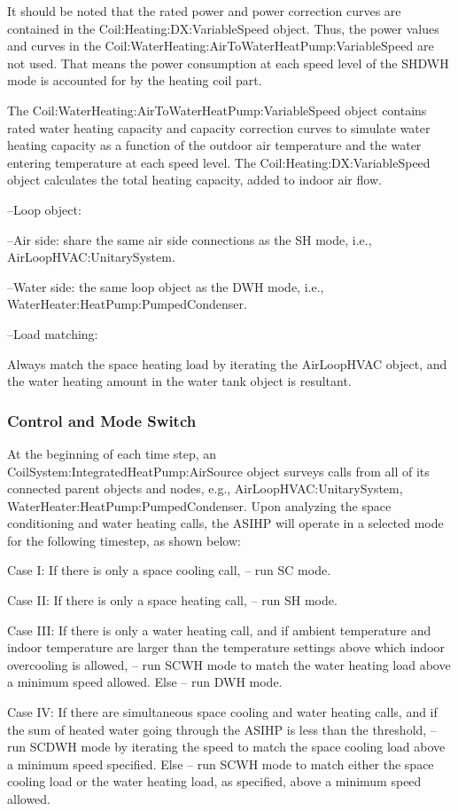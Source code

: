 It should be noted that the rated power and power correction curves are contained in the Coil:Heating:DX:VariableSpeed object. Thus, the power values and curves in the Coil:WaterHeating:AirToWaterHeatPump:VariableSpeed are not used. That means the power consumption at each speed level of the SHDWH mode is accounted for by the heating coil part.

The Coil:WaterHeating:AirToWaterHeatPump:VariableSpeed object contains rated water heating capacity and capacity correction curves to simulate water heating capacity as a function of the outdoor air temperature and the water entering temperature at each speed level. The Coil:Heating:DX:VariableSpeed object calculates the total heating capacity, added to indoor air flow.

--Loop object:

--Air side: share the same air side connections as the SH mode, i.e., AirLoopHVAC:UnitarySystem.

--Water side: the same loop object as the DWH mode, i.e., WaterHeater:HeatPump:PumpedCondenser.

--Load matching:

Always match the space heating load by iterating the AirLoopHVAC object, and the water heating amount in the water tank object is resultant.

\subsubsection{Control and Mode Switch}\label{Control-and-Mode-Switch-ASIHP}

At the beginning of each time step, an CoilSystem:IntegratedHeatPump:AirSource object surveys calls from all of its connected parent objects and nodes, e.g.,  AirLoopHVAC:UnitarySystem, WaterHeater:HeatPump:PumpedCondenser. Upon analyzing the space conditioning and water heating calls, the ASIHP will operate in a selected mode for the following timestep, as shown below:

Case I:
If there is only a space cooling call, – run SC mode.

Case II:
If there is only a space heating call, – run SH mode.

Case III:
If there is only a water heating call, and if ambient temperature and indoor temperature are larger than the temperature settings above which indoor overcooling is allowed, – run SCWH mode to match the water heating load above a minimum speed allowed.
Else – run DWH mode.

Case IV:
If there are simultaneous space cooling and water heating calls, and if the sum of heated water going through the ASIHP is less than the threshold, – run SCDWH mode by iterating the speed to match the space cooling load above a minimum speed specified.
Else – run SCWH mode to match either the space cooling load or the water heating load, as specified, above a minimum speed allowed.

